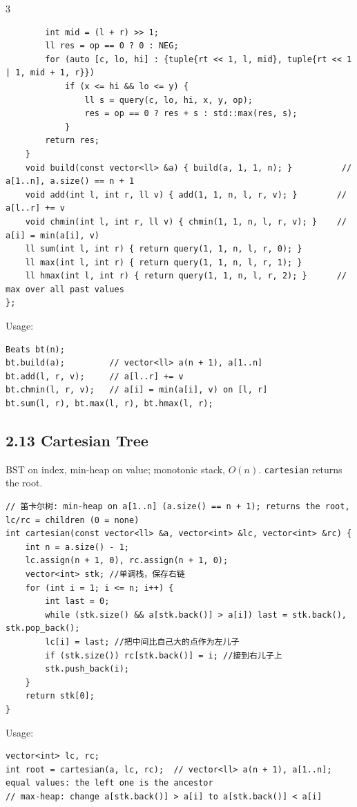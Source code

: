\documentclass[8pt]{extarticle}
\begin{document}
\begin{multicols*}{3}
\begin{lstlisting}
        int mid = (l + r) >> 1;
        ll res = op == 0 ? 0 : NEG;
        for (auto [c, lo, hi] : {tuple{rt << 1, l, mid}, tuple{rt << 1 | 1, mid + 1, r}})
            if (x <= hi && lo <= y) {
                ll s = query(c, lo, hi, x, y, op);
                res = op == 0 ? res + s : std::max(res, s);
            }
        return res;
    }
    void build(const vector<ll> &a) { build(a, 1, 1, n); }          // a[1..n], a.size() == n + 1
    void add(int l, int r, ll v) { add(1, 1, n, l, r, v); }        // a[l..r] += v
    void chmin(int l, int r, ll v) { chmin(1, 1, n, l, r, v); }    // a[i] = min(a[i], v)
    ll sum(int l, int r) { return query(1, 1, n, l, r, 0); }
    ll max(int l, int r) { return query(1, 1, n, l, r, 1); }
    ll hmax(int l, int r) { return query(1, 1, n, l, r, 2); }      // max over all past values
};
\end{lstlisting}

Usage:

\begin{lstlisting}
Beats bt(n);
bt.build(a);         // vector<ll> a(n + 1), a[1..n]
bt.add(l, r, v);     // a[l..r] += v
bt.chmin(l, r, v);   // a[i] = min(a[i], v) on [l, r]
bt.sum(l, r), bt.max(l, r), bt.hmax(l, r);
\end{lstlisting}

\subsection*{2.13 Cartesian Tree}

BST on index, min-heap on value; monotonic stack, $O(n)$. \texttt{cartesian} returns the root.

\begin{lstlisting}
// 笛卡尔树: min-heap on a[1..n] (a.size() == n + 1); returns the root, lc/rc = children (0 = none)
int cartesian(const vector<ll> &a, vector<int> &lc, vector<int> &rc) {
    int n = a.size() - 1;
    lc.assign(n + 1, 0), rc.assign(n + 1, 0);
    vector<int> stk; //单调栈，保存右链
    for (int i = 1; i <= n; i++) {
        int last = 0;
        while (stk.size() && a[stk.back()] > a[i]) last = stk.back(), stk.pop_back();
        lc[i] = last; //把中间比自己大的点作为左儿子
        if (stk.size()) rc[stk.back()] = i; //接到右儿子上
        stk.push_back(i);
    }
    return stk[0];
}
\end{lstlisting}

Usage:

\begin{lstlisting}
vector<int> lc, rc;
int root = cartesian(a, lc, rc);  // vector<ll> a(n + 1), a[1..n]; equal values: the left one is the ancestor
// max-heap: change a[stk.back()] > a[i] to a[stk.back()] < a[i]
\end{lstlisting}


\end{multicols*}
\end{document}
